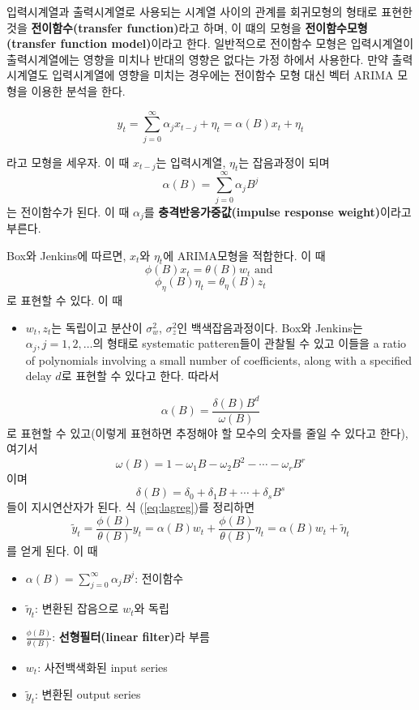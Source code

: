 \documentclass[b5paper,]{scrbook}
\providecommand{\tightlist}{%
  \setlength{\itemsep}{0pt}\setlength{\parskip}{0pt}}
\theoremstyle{plain}
\theoremstyle{definition}
\numberwithin{equation}{section}
\begin{document}
입력시계열과 출력시계열로 사용되는 시계열 사이의 관계를 회귀모형의
형태로 표현한 것을 \textbf{전이함수(transfer function)}라고 하며, 이
떄의 모형을 \textbf{전이함수모형(transfer function model)}이라고 한다.
일반적으로 전이함수 모형은 입력시계열이 출력시계열에는 영향을 미치나
반대의 영향은 없다는 가정 하에서 사용한다. 만약 출력시계열도
입력시계열에 영향을 미치는 경우에는 전이함수 모형 대신 벡터 ARIMA 모형을
이용한 분석을 한다.

\begin{equation}\label{eq:lagreg}
y_{t}=\sum_{j=0}^{\infty}\alpha_{j}x_{t-j}+\eta_{t}=\alpha(B)x_{t}+\eta_{t}
\end{equation}

라고 모형을 세우자. 이 때 \(x_{t-j}\)는 입력시계열, \(\eta_{t}\)는
잡음과정이 되며 \[\alpha(B)=\sum_{j=0}^{\infty}\alpha_{j}B^{j}\] 는
전이함수가 된다. 이 때 \(\alpha_{j}\)를 \textbf{충격반응가중값(impulse
response weight)}이라고 부른다.

Box와 Jenkins에 따르면, \(x_{t}\)와 \(\eta_{t}\)에 ARIMA모형을 적합한다.
이 때 \[\phi(B)x_{t}=\theta(B)w_{t} \text{ and }\]
\[\phi_{\eta}(B)\eta_{t}=\theta_{\eta}(B)z_{t}\] 로 표현할 수 있다. 이
때

\begin{itemize}
\tightlist
\item
  \(w_{t},z_{t}\)는 독립이고 분산이 \(\sigma_{w}^{2}\),
  \(\sigma_{z}^{2}\)인 백색잡음과정이다. Box와 Jenkins는
  \(\alpha_{j}, j=1,2,\ldots\)의 형태로 systematic patteren들이 관찰될
  수 있고 이들을 a ratio of polynomials involving a small number of
  coefficients, along with a specified delay \(d\)로 표현할 수 있다고
  한다. 따라서
\end{itemize}

\[\alpha(B)=\frac{\delta (B)B^{d}}{\omega(B)}\] 로 표현할 수 있고(이렇게
표현하면 추정해야 할 모수의 숫자를 줄일 수 있다고 한다), 여기서
\[\omega(B)=1-\omega_{1}B-\omega_{2}B^{2}-\cdots -\omega_{r}B^{r}\] 이며
\[\delta(B)=\delta_{0}+\delta_{1}B+\cdots +\delta_{s}B^{s}\] 들이
지시연산자가 된다. 식 (\eqref{eq:lagreg})를 정리하면
\[\tilde{y}_{t}=\frac{\phi(B)}{\theta(B)}y_{t}=\alpha(B)w_{t}+\frac{\phi(B)}{\theta(B)}\eta_{t}=\alpha(B)w_{t}+\tilde{\eta}_{t}\]
를 얻게 된다. 이 때

\begin{itemize}
\item
  \(\alpha(B)=\sum_{j=0}^{\infty}\alpha_{j}B^{j}\): 전이함수
\item
  \(\tilde{\eta}_{t}\): 변환된 잡음으로 \(w_{t}\)와 독립
\item
  \(\frac{\phi(B)}{\theta(B)}\): \textbf{선형필터(linear filter)}라 부름
\item
  \(w_{t}\): 사전백색화된 input series
\item
  \(\tilde{y}_{t}\): 변환된 output series
\end{itemize}
\end{document}
